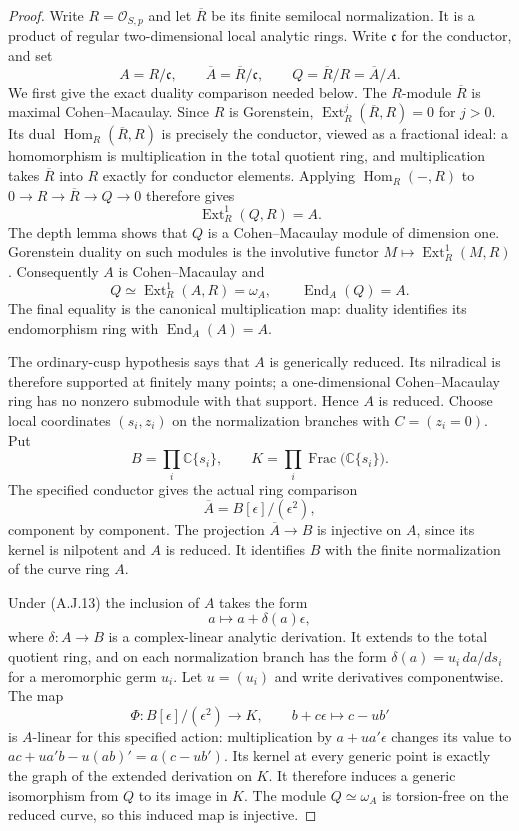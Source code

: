 \begin{proof}
Write $R=\mathcal O_{S,p}$ and let $\overline R$ be its
finite semilocal normalization. It is a product of regular
two-dimensional local analytic rings. Write $\mathfrak c$
for the conductor, and set
\[
 A=R/\mathfrak c,\qquad
 \overline A=\overline R/\mathfrak c,\qquad
 Q=\overline R/R=\overline A/A.
\]
We first give the exact duality comparison needed below.
The $R$-module $\overline R$ is maximal Cohen--Macaulay.
Since $R$ is Gorenstein,
$\operatorname{Ext}_R^j(\overline R,R)=0$ for $j>0$.
Its dual $\operatorname{Hom}_R(\overline R,R)$ is
precisely the conductor, viewed as a fractional ideal:
a homomorphism is multiplication in the total quotient ring,
and multiplication takes $\overline R$ into $R$ exactly
for conductor elements. Applying $\operatorname{Hom}_R(-,R)$
to $0\to R\to\overline R\to Q\to0$ therefore gives
\[
 \operatorname{Ext}_R^1(Q,R)=A.                    \tag{A.J.11}
\]
The depth lemma shows that $Q$ is a Cohen--Macaulay module
of dimension one. Gorenstein duality on such modules is the
involutive functor $M\mapsto\operatorname{Ext}_R^1(M,R)$.
Consequently $A$ is Cohen--Macaulay and
\[
 Q\simeq\operatorname{Ext}_R^1(A,R)=\omega_A,
 \qquad \operatorname{End}_A(Q)=A.                \tag{A.J.12}
\]
The final equality is the canonical multiplication map:
duality identifies its endomorphism ring with
$\operatorname{End}_A(A)=A$.

The ordinary-cusp hypothesis says that $A$ is generically
reduced. Its nilradical is therefore supported at finitely
many points; a one-dimensional Cohen--Macaulay ring has
no nonzero submodule with that support. Hence $A$ is reduced.
Choose local coordinates $(s_i,z_i)$ on the normalization
branches with $C=(z_i=0)$. Put
\[
 B=\prod_i\mathbb C\{s_i\},\qquad
 K=\prod_i\operatorname{Frac}\bigl(\mathbb C\{s_i\}\bigr).
\]
The specified conductor gives the actual ring comparison
\[
 \overline A=B[\epsilon]/(\epsilon^2),             \tag{A.J.13}
\]
component by component. The projection
$\overline A\to B$ is injective on $A$, since its kernel
is nilpotent and $A$ is reduced. It identifies $B$ with
the finite normalization of the curve ring $A$.

Under (A.J.13) the inclusion of $A$ takes the form
\[
 a\longmapsto a+\delta(a)\epsilon,
\]
where $\delta:A\to B$ is a complex-linear analytic
derivation. It extends to the total quotient ring, and on
each normalization branch has the form
$\delta(a)=u_i\,da/ds_i$ for a meromorphic germ $u_i$.
Let $u=(u_i)$ and write derivatives componentwise.
The map
\[
 \Phi:B[\epsilon]/(\epsilon^2)\longrightarrow K,
 \qquad b+c\epsilon\longmapsto c-u b'
                                                        \tag{A.J.14}
\]
is $A$-linear for this specified action: multiplication by
$a+u a'\epsilon$ changes its value to
$ac+u a'b-u(ab)'=a(c-u b')$. Its kernel at every generic
point is exactly the graph of the extended derivation on
$K$. It therefore induces a generic isomorphism from $Q$
to its image in $K$. The module $Q\simeq\omega_A$ is
torsion-free on the reduced curve, so this induced map is
injective.


\end{proof}
